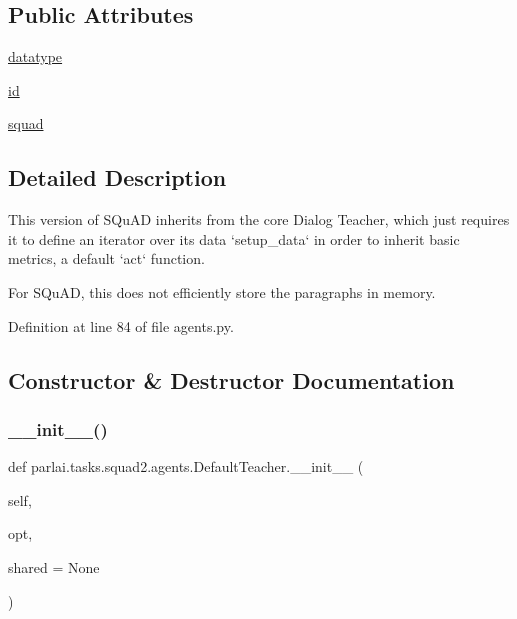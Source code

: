 \subsection*{Public Attributes}
\begin{DoxyCompactItemize}
\item 
\hyperlink{classparlai_1_1tasks_1_1squad2_1_1agents_1_1DefaultTeacher_a94222f3b61455346a81469cb340906a1}{datatype}
\item 
\hyperlink{classparlai_1_1tasks_1_1squad2_1_1agents_1_1DefaultTeacher_ac4998f160789f2d35c7ddc9c8b24792e}{id}
\item 
\hyperlink{classparlai_1_1tasks_1_1squad2_1_1agents_1_1DefaultTeacher_a69f44b45bdcb0f11323c45781c4b20a2}{squad}
\end{DoxyCompactItemize}


\subsection{Detailed Description}
\begin{DoxyVerb}This version of SQuAD inherits from the core Dialog Teacher, which just requires it
to define an iterator over its data `setup_data` in order to inherit basic metrics,
a default `act` function.

For SQuAD, this does not efficiently store the paragraphs in memory.
\end{DoxyVerb}
 

Definition at line 84 of file agents.\+py.



\subsection{Constructor \& Destructor Documentation}
\mbox{\label{classparlai_1_1tasks_1_1squad2_1_1agents_1_1DefaultTeacher_aa97ab84de16c6d73501fef0c11bb1608}} 
\subsubsection{\texorpdfstring{\+\_\+\+\_\+init\+\_\+\+\_\+()}{\_\_init\_\_()}}
{\footnotesize\ttfamily def parlai.\+tasks.\+squad2.\+agents.\+Default\+Teacher.\+\_\+\+\_\+init\+\_\+\+\_\+ (\begin{DoxyParamCaption}\item[{}]{self,  }\item[{}]{opt,  }\item[{}]{shared = {\ttfamily None} }\end{DoxyParamCaption})}




